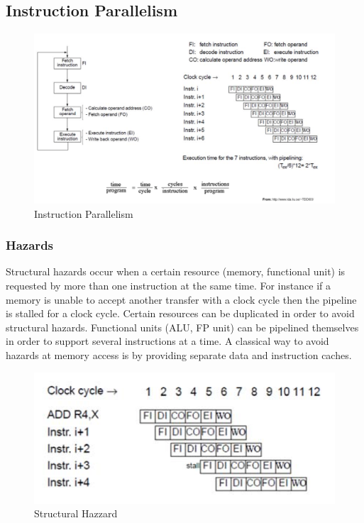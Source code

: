 \subsection{Instruction Parallelism}
\begin{figure}[H]
\centering
\includegraphics[width=13cm]{pic/instruction_parallelism}
\caption{Instruction Parallelism}
\end{figure}

\subsubsection{Hazards}

Structural hazards occur when a certain resource (memory, functional unit) is requested by more than one instruction at the same time. For instance if a memory is unable to accept another transfer with a clock cycle then the pipeline is stalled for a clock cycle. Certain resources can be duplicated in order to avoid structural hazards. Functional units (ALU, FP unit) can be pipelined themselves in order to support several instructions at a time. A classical way to avoid hazards at memory access is by providing separate data and instruction caches. \newline

\begin{figure}[H]
\centering
\includegraphics{pic/structural_hazard}
\caption{Structural Hazzard}
\end{figure}



